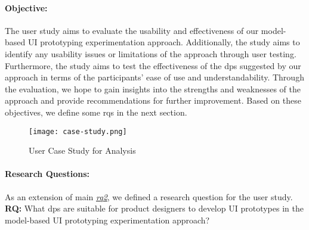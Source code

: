 
\paragraph{Objective:}
The user study aims to evaluate the usability and effectiveness of our model-based UI prototyping experimentation approach. 
Additionally, the study aims to identify any usability issues or limitations of the approach through user testing. 
Furthermore, the study aims to test the effectiveness of the \ac{dp}s suggested by our approach in terms of the participants' ease of use and understandability. 
Through the evaluation, we hope to gain insights into the strengths and weaknesses of the approach and provide recommendations for further improvement.
Based on these objectives, we define some \ac{rq}s in the next section.

\begin{figure}[ht]
  \centering
  \texttt{[image: case-study.png]}
  \caption{User Case Study for Analysis}
  \label{evaluation:fig:casestudy}
\end{figure}

\paragraph{Research Questions:}
As an extension of main \textit{\hyperref[introduction:section:research]{\ac{rq}2}}, we defined a research question for the user study. \\
\textbf{RQ:} What \ac{dp}s are suitable for product designers to develop UI prototypes in the model-based UI prototyping experimentation approach?


